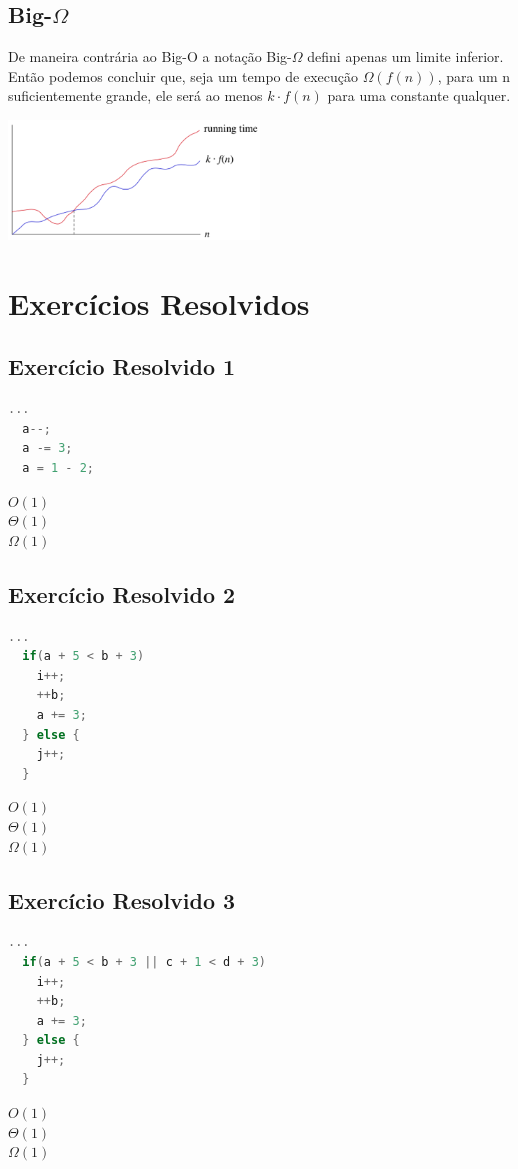 \documentclass[12pt]{article}
\begin{document}
\subsection{Big-$\Omega$}
De maneira contrária ao Big-O a notação Big-$\Omega$ defini apenas um limite inferior.
Então podemos concluir que, seja um tempo de execução $\Omega(f(n))$, para um n suficientemente 
grande, ele será ao menos $k \cdot f(n)$ para uma constante qualquer.\\

\begin{center}
    \includegraphics[width=0.5\textwidth]{images/omega_n.png}\\   
\end{center}

\section{Exercícios Resolvidos}

\subsection{Exercício Resolvido 1}
\begin{lstlisting}[language=C]
  ...
  a--;
  a -= 3;
  a = 1 - 2;
\end{lstlisting}
$O(1)$\\
$\Theta(1)$\\
$\Omega(1)$\\


\subsection{Exercício Resolvido 2}
\begin{lstlisting}[language=C]
  ...
  if(a + 5 < b + 3)
    i++;
    ++b;
    a += 3;
  } else {
    j++;
  }
\end{lstlisting}
$O(1)$\\
$\Theta(1)$\\
$\Omega(1)$\\

\subsection{Exercício Resolvido 3}
\begin{lstlisting}[language=C]
  ...
  if(a + 5 < b + 3 || c + 1 < d + 3)
    i++;
    ++b;
    a += 3;
  } else {
    j++;
  }
\end{lstlisting}
$O(1)$\\
$\Theta(1)$\\
$\Omega(1)$\\
\end{document}
